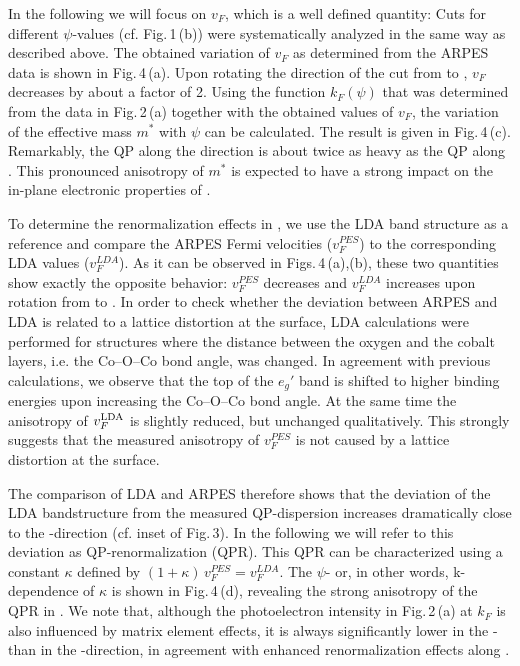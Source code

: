\documentclass[preprint,showpacs,preprintnumbers,amsmath,amssymb,twoside,aps]{revtex4}
\begin{document}
In the following we will focus on $v_F$, which is a well defined quantity: Cuts for different $\psi$-values (cf. Fig.\,1\,(b)) were systematically
analyzed in the same way as described above. The obtained variation of $v_F$ as determined from the ARPES data is shown in Fig.\,4\,(a). Upon
rotating the direction of the cut from \GM\/ to \GK\/, $v_F$ decreases by about a factor of 2.
Using the function $k_F(\psi)$ that was determined from the data in Fig.\,2\,(a) together with the obtained values of $v_F$, the variation of the
effective mass $m^*$ with $\psi$ can be calculated. The result is given in Fig.\,4\,(c). Remarkably, the QP along the \GK\/ direction is about twice
as heavy as the QP along \GM. This pronounced anisotropy of $m^*$ is expected to have a strong impact on the in-plane electronic properties of \NCO.




To determine the renormalization effects in \NCO, we use the LDA band structure as a reference and compare the ARPES Fermi velocities ($v_F^{PES}$)
to the corresponding LDA values ($v_F^{LDA}$). As it can be observed in Figs.\,4\,(a),(b), these two quantities show exactly the opposite behavior:
$v_F^{PES}$ decreases and $v_F^{LDA}$ increases upon rotation from \GM\/ to \GK.
%
In order to check whether the deviation between ARPES and LDA is related to a lattice distortion at the surface, LDA calculations were performed for
structures where the distance between the oxygen and the cobalt layers, i.e. the Co--O--Co bond angle, was changed. In agreement with previous
calculations, we observe that the top of the $e_g'$ band is shifted to higher binding energies upon increasing the Co--O--Co bond angle. At the same
time the anisotropy of $v_F^{\rm LDA}$ is slightly reduced, but unchanged qualitatively. This strongly suggests  that the measured anisotropy of
$v_F^{PES}$ is not caused by a lattice distortion at the surface.


 The comparison of LDA and ARPES therefore shows that the deviation of the LDA
bandstructure from the measured QP-dispersion increases dramatically close to the \GK-direction (cf. inset of Fig.\,3). In the following we will
refer to this deviation as QP-renormalization (QPR).
%
This QPR can be characterized using a constant $\kappa$ defined by $(1+\kappa)\,v_F^{PES}=v_F^{LDA}$. The $\psi$- or, in other words, k-dependence of
$\kappa$ is shown in Fig.\,4\,(d), revealing the strong anisotropy of the QPR in \NCO. We note that, although the photoelectron intensity in
Fig.\,2\,(a) at $k_F$ is also influenced by matrix element effects, it is always significantly lower in the \GK- than in the \GM-direction, in
agreement with enhanced renormalization effects along \GK.
\end{document}
